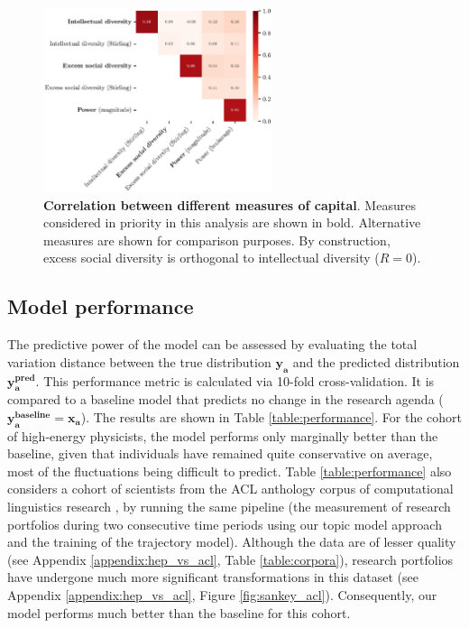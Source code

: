 \documentclass{article}
\begin{document}
\begin{figure}[h]
    \centering
    \includegraphics[width=0.6\textwidth]{Fig12.eps}
    \caption{\textbf{Correlation between different measures of capital}. Measures considered in priority in this analysis are shown in bold. Alternative measures are shown for comparison purposes. By construction, excess social diversity is orthogonal to intellectual diversity ($R=0$). }
    \label{fig:capital_measures}
\end{figure}

\subsection{\label{appendix:model-performance}Model performance}

The predictive power of the model can be assessed by evaluating the total variation distance between the true distribution $\bm{y_a}$ and the predicted distribution $\bm{y_a^{\text{pred}}}$. This performance metric is calculated via 10-fold cross-validation. It is compared  to a baseline model that predicts no change in the research agenda ($\bm{y_a^{\text{baseline}}}=\bm{x_a}$). The results are shown in Table \ref{table:performance}. For the cohort of high-energy physicists, the model performs only marginally better than the baseline, given that individuals have remained quite conservative on average, most of the fluctuations being difficult to predict. Table \ref{table:performance} also considers a cohort of scientists from the ACL anthology corpus  of computational linguistics research \citep{acl_anthology_corpus}, by running the same pipeline (the measurement of research portfolios during two consecutive time periods using our topic model approach and the training of the trajectory model). Although the data are of lesser quality (see Appendix \ref{appendix:hep_vs_acl}, Table \ref{table:corpora}), research portfolios have undergone much more significant transformations in this dataset (see Appendix \ref{appendix:hep_vs_acl}, Figure \ref{fig:sankey_acl}). Consequently, our model performs much better than the baseline for this cohort.
\end{document}

